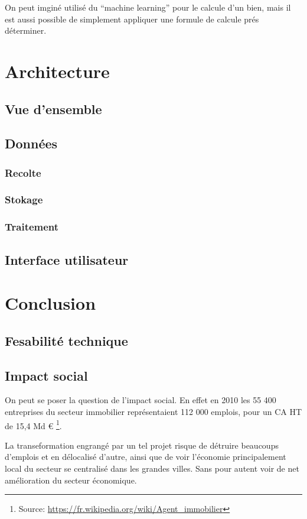 \documentclass[12pt]{report}
\begin{document}
On peut imginé utilisé du ``machine learning'' pour le calcule d'un bien, mais
il est aussi possible de simplement appliquer une formule de calcule prés
déterminer.

\chapter{Architecture}
\section{Vue d'ensemble}
\section{Données}
\subsection{Recolte}
\subsection{Stokage}
\subsection{Traitement}
\section{Interface utilisateur}

\chapter{Conclusion}
\section{Fesabilité technique}

\section{Impact social}
On peut se poser la question de l'impact social.
En effet en 2010 les 55 400 entreprises du secteur immobilier représentaient
112 000 emplois, pour un CA HT de 15,4 Md \euro{}
\footnote{Source: \url{https://fr.wikipedia.org/wiki/Agent_immobilier}}.

La transeformation engrangé par un tel projet risque de détruire beaucoups
d'emplois et en délocalisé d'autre, ainsi que de voir l'économie principalement
local du secteur se centralisé dans les grandes villes. Sans pour autent voir de
net amélioration du secteur économique. 
\end{document}
